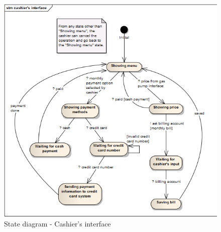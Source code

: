 \documentclass[11pt,a4paper]{article}
\begin{document}
\begin{figure}[H]
 \centering
 \includegraphics[width=\textwidth]{../state-diagram-cashier-interface.png} 
 \caption{State diagram - Cashier's interface}
 \label{fig:state2}
\end{figure}
\end{document}
